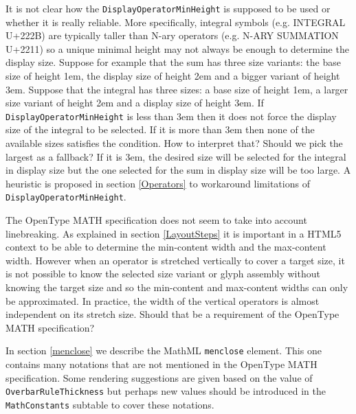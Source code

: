 It is not clear how the {\tt DisplayOperatorMinHeight} is
supposed to be used or whether it is really reliable. More specifically,
integral symbols (e.g. INTEGRAL U+222B) are typically taller than N-ary
operators (e.g. N-ARY SUMMATION U+2211) so a unique minimal height may not
always be enough to determine the display size. Suppose for example that the
sum has three size variants: the base size of height 1em, the display size
of height 2em and a bigger variant of height 3em.
Suppose that the integral has three sizes: a base size of
height 1em, a larger size variant of height 2em and a display size of height
3em. If {\tt DisplayOperatorMinHeight} is less than
3em then it does not force the display size of the integral to be selected.
If it is more than 3em then none of the available sizes satisfies the
condition. How to interpret that? Should we pick the largest as a fallback?
If it is 3em, the desired size will be selected for the integral in display
size but the one selected for the sum in display size will be too large.
A heuristic is proposed in section \ref{Operators} to workaround limitations
of {\tt DisplayOperatorMinHeight}.

The OpenType MATH specification does not seem to take into account
linebreaking. As explained in section \ref{LayoutSteps} it is important in a
HTML5 context to be able to determine the min-content width and the max-content
width. However when an operator is stretched vertically to cover a target size,
it is not possible to know the selected size variant or glyph assembly without
knowing the target size and so the min-content and max-content widths can only
be approximated. In practice, the width of the vertical operators is almost
independent on its stretch size. Should that be a requirement of the
OpenType MATH specification?

In section \ref{menclose} we describe the MathML {\tt menclose} element. This
one contains many notations that are not mentioned in the OpenType MATH
specification. Some rendering suggestions are given based on the value of
{\tt OverbarRuleThickness} but perhaps new values should be
introduced in the {\tt MathConstants} subtable to cover these
notations.
